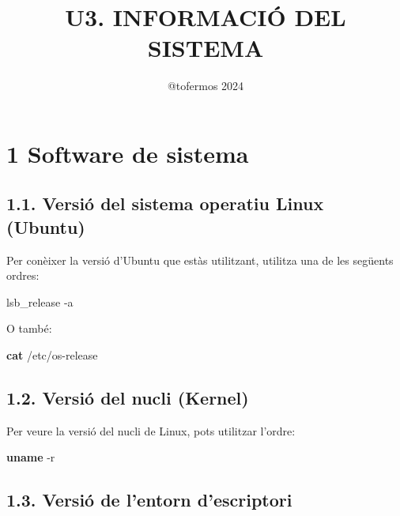 \documentclass[
  a4paper,
]{article}
\title{U3. INFORMACIÓ DEL SISTEMA}
\author{@tofermos 2024}
\date{}
\newenvironment{Shaded}{\begin{snugshade}}{\end{snugshade}}
\newcommand{\AttributeTok}[1]{\textcolor[rgb]{0.13,0.29,0.53}{#1}}
\newcommand{\ExtensionTok}[1]{#1}
\newcommand{\FunctionTok}[1]{\textcolor[rgb]{0.13,0.29,0.53}{\textbf{#1}}}
\newcommand{\NormalTok}[1]{#1}
\begin{document}
\maketitle

{
\setcounter{tocdepth}{2}
\tableofcontents
}
\newpage
\renewcommand\tablename{Tabla}

\section{1 Software de sistema}\label{software-de-sistema}

\subsection{1.1. Versió del sistema operatiu Linux
(Ubuntu)}\label{versiuxf3-del-sistema-operatiu-linux-ubuntu}

Per conèixer la versió d'Ubuntu que estàs utilitzant, utilitza una de
les següents ordres:

\begin{Shaded}
\begin{Highlighting}[]
\ExtensionTok{lsb\_release} \AttributeTok{{-}a}
\end{Highlighting}
\end{Shaded}

O també:

\begin{Shaded}
\begin{Highlighting}[]
\FunctionTok{cat}\NormalTok{ /etc/os{-}release}
\end{Highlighting}
\end{Shaded}

\subsection{1.2. Versió del nucli
(Kernel)}\label{versiuxf3-del-nucli-kernel}

Per veure la versió del nucli de Linux, pots utilitzar l'ordre:

\begin{Shaded}
\begin{Highlighting}[]
\FunctionTok{uname} \AttributeTok{{-}r}
\end{Highlighting}
\end{Shaded}

\subsection{1.3. Versió de l'entorn
d'escriptori}\label{versiuxf3-de-lentorn-descriptori}
\end{document}
